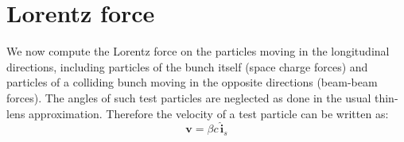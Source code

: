 %
%
%
%
%
%
%
%

\section{Lorentz force}
We now compute the Lorentz force on the particles moving in the longitudinal directions, including particles of the bunch itself (space charge forces) and particles of a colliding bunch moving in the opposite directions (beam-beam forces).
The angles of such test particles are neglected as done in the usual thin-lens approximation. Therefore the velocity of a test particle can be written as:
\begin{equation}
\textbf{v} = \beta c\, \hat{\textbf{i}}_s
\end{equation}

